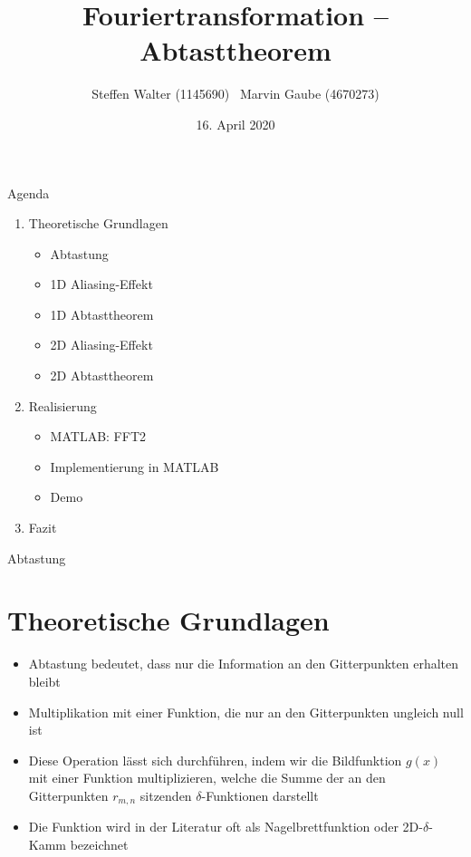 \documentclass{beamer}
\title{Fouriertransformation -- Abtasttheorem}
\author{Steffen Walter (1145690) \ Marvin Gaube (4670273)}
\institute{Duale Hochschule Baden-Württemberg -- Stuttgart\newline Vorlesung: Digitale Bildverarbeitung}
\date{16. April 2020}
\begin{document}
	\maketitle
	\begin{frame}{Agenda}
		\begin{enumerate}
			\item Theoretische Grundlagen
			\begin{itemize}
				\item Abtastung
				\item 1D Aliasing-Effekt
				\item 1D Abtasttheorem
				\item 2D Aliasing-Effekt
				\item 2D Abtasttheorem
			\end{itemize}
			\item Realisierung
			\begin{itemize}
				\item MATLAB: FFT2
				\item Implementierung in MATLAB
				\item Demo
			\end{itemize}
			\item Fazit
		\end{enumerate}
	\end{frame}

	
	\begin{frame}{Abtastung}
	\section{Theoretische Grundlagen}
	\begin{itemize}
		\item Abtastung bedeutet, dass nur die Information an den Gitterpunkten erhalten bleibt
		\item Multiplikation mit einer Funktion, die nur an den Gitterpunkten ungleich null ist
		\item Diese Operation lässt sich durchführen, indem wir die Bildfunktion $g(x)$ mit einer Funktion multiplizieren, welche die Summe der an den Gitterpunkten $r_{m,n}$ sitzenden $\delta$-Funktionen darstellt
		\item Die Funktion wird in der Literatur oft als Nagelbrettfunktion oder 2D-$\delta$-Kamm bezeichnet
	\end{itemize}	
	\end{frame}
\end{document}
